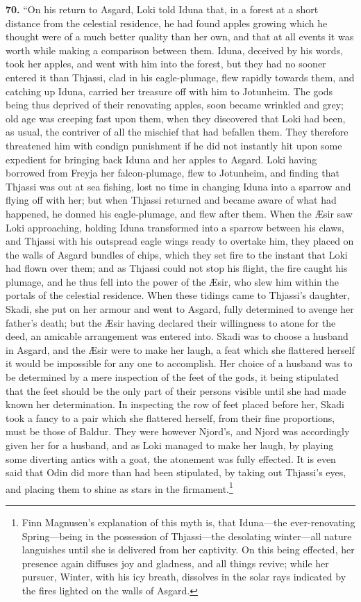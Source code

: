 \textbf{70.} ``On his return to Asgard, Loki told Iduna that, in a forest at a
short distance from the celestial residence, he had found apples
growing which he thought were of a much better quality than her own,
and that at all events it was worth while making a comparison between
them. Iduna, deceived by his words, took her apples, and went with him
into the forest, but they had no sooner entered it than Thjassi, clad
in his eagle-plumage, flew rapidly towards them, and catching up
Iduna, carried her treasure off with him to Jotunheim. The gods being
thus deprived of their renovating apples, soon became wrinkled and
grey; old age was creeping fast upon them, when they discovered that
Loki had been, as usual, the contriver of all the mischief that had
befallen them. They therefore threatened him with condign punishment
if he did not instantly hit upon some expedient for bringing back
Iduna and her apples to Asgard. Loki having borrowed from Freyja her
falcon-plumage, flew to Jotunheim, and finding that Thjassi was out at
sea fishing, lost no time in changing Iduna into a sparrow and flying
off with her; but when Thjassi returned and became aware of what had
happened, he donned his eagle-plumage, and flew after them. When the
Æsir saw Loki approaching, holding Iduna transformed into a sparrow
between his claws, and Thjassi with his outspread eagle wings ready to
overtake him, they placed on the walls of Asgard bundles of chips,
which they set fire to the instant that Loki had flown over them; and
as Thjassi could not stop his flight, the fire caught his plumage, and
he thus fell into the power of the Æsir, who slew him within the
portals of the celestial residence. When these tidings came to
Thjassi's daughter, Skadi, she put on her armour and went to Asgard,
fully determined to avenge her father's death; but the Æsir having
declared their willingness to atone for the deed, an amicable
arrangement was entered into. Skadi was to choose a husband in Asgard,
and the Æsir were to make her laugh, a feat which she flattered
herself it would be impossible for any one to accomplish. Her choice
of a husband was to be determined by a mere inspection of the feet of
the gods, it being stipulated that the feet should be the only part of
their persons visible until she had made known her determination. In
inspecting the row of feet placed before her, Skadi took a fancy to a
pair which she flattered herself, from their fine proportions, must be
those of Baldur. They were however Njord's, and Njord was accordingly
given her for a husband, and as Loki managed to make her laugh, by
playing some diverting antics with a goat, the atonement was fully
effected. It is even said that Odin did more than had been stipulated,
by taking out Thjassi's eyes, and placing them to shine as stars in
the firmament.\footnote{Finn Magnusen's explanation of this myth is, that
Iduna—the ever-renovating Spring—being in the possession of
Thjassi—the desolating winter—all nature languishes until she is
delivered from her captivity. On this being effected, her presence
again diffuses joy and gladness, and all things revive; while her
pursuer, Winter, with his icy breath, dissolves in the solar rays
indicated by the fires lighted on the walls of Asgard.}

